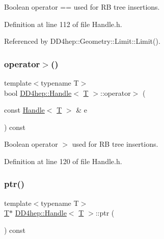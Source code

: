 Boolean operator == used for RB tree insertions. 



Definition at line 112 of file Handle.\+h.



Referenced by D\+D4hep\+::\+Geometry\+::\+Limit\+::\+Limit().

\hypertarget{class_d_d4hep_1_1_handle_a9e283b9c09a2c7a1ca86cf9603cc9f4d}{}\label{class_d_d4hep_1_1_handle_a9e283b9c09a2c7a1ca86cf9603cc9f4d} 
\subsubsection{\texorpdfstring{operator$>$()}{operator>()}}
{\footnotesize\ttfamily template$<$typename T$>$ \\
bool \hyperlink{class_d_d4hep_1_1_handle}{D\+D4hep\+::\+Handle}$<$ \hyperlink{class_t}{T} $>$\+::operator$>$ (\begin{DoxyParamCaption}\item[{const \hyperlink{class_d_d4hep_1_1_handle}{Handle}$<$ \hyperlink{class_t}{T} $>$ \&}]{e }\end{DoxyParamCaption}) const\hspace{0.3cm}{\ttfamily [inline]}}



Boolean operator $>$ used for RB tree insertions. 



Definition at line 120 of file Handle.\+h.

\hypertarget{class_d_d4hep_1_1_handle_a6f165a9eec329d2d65172767b5f2777a}{}\label{class_d_d4hep_1_1_handle_a6f165a9eec329d2d65172767b5f2777a} 
\subsubsection{\texorpdfstring{ptr()}{ptr()}}
{\footnotesize\ttfamily template$<$typename T$>$ \\
\hyperlink{class_t}{T}$\ast$ \hyperlink{class_d_d4hep_1_1_handle}{D\+D4hep\+::\+Handle}$<$ \hyperlink{class_t}{T} $>$\+::ptr (\begin{DoxyParamCaption}{ }\end{DoxyParamCaption}) const\hspace{0.3cm}{\ttfamily [inline]}}



